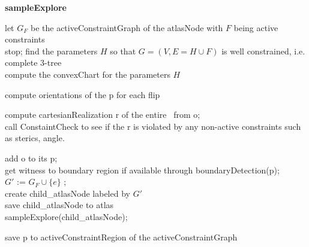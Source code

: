 \begin{algorithm} [htbp]

  {\bf sampleExplore}\\
  \BlankLine

	let $G_F$ be the activeConstraintGraph of the atlasNode with $F$ being active constraints\\
		{stop;	}
	find the parameters $H$ so that $G = (V, E = H\cup F)$ is well constrained, i.e. complete 3-tree\\
	compute the convexChart for the parameters $H$\\



	{
		compute orientations of the p for each flip\\ %

		{

			compute cartesianRealization r of the entire \helix\ from o;\\
			call ConstaintCheck to see if the r is violated by any non-active constraints such as sterics, angle.\\
			{

				add o to its p;\\
				get witness to boundary region if available through boundaryDetection(p);\\
				{
					$G{\prime}$ := $G_F \cup \{e\}$ ;\\
					{
						create child\_atlasNode labeled by $G{\prime}$\\
						save child\_atlasNode to atlas\\
						sampleExplore(child\_atlasNode);\\
					}
				}
			}
		}

		save p to activeConstraintRegion of the activeConstraintGraph\\
	}

   \caption{ sampleExplore
\label{alg:sampleExplore}}
\end{algorithm}





